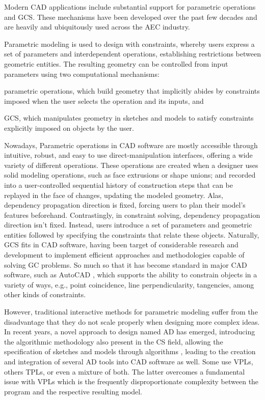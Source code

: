 \cleardoublepage
\label{chap:intro}

\noindent
Modern \ac{CAD} applications include substantial support for parametric
operations and \ac{GCS}.  These mechanisms have been developed over the past few
decades \cite{Bettig:2011:GCSPC:1.3593408} and are heavily and ubiquitously used
across the \ac{AEC} industry.

Parametric modeling is used to design with constraints, whereby users express a
set of parameters and interdependent operations, establishing restrictions
between geometric entities.  The resulting geometry can be controlled from input
parameters using two computational mechanisms:
\begin{enumerate*}[label=(\arabic*)]
  \item parametric operations, which build geometry that implicitly abides by
  constraints imposed when the user selects the operation and its inputs, and
  \item \ac{GCS}, which manipulates geometry in sketches and models to satisfy
  constraints explicitly imposed on objects by the user.
\end{enumerate*}

Nowadays, Parametric operations in \ac{CAD} software are mostly accessible
through intuitive, robust, and easy to use direct-manipulation interfaces,
offering a wide variety of different operations.  These operations are created
when a designer uses solid modeling operations, such as face extrusions or shape
unions; and recorded into a user-controlled sequential history of construction
steps that can be replayed in the face of changes, updating the modeled
geometry.  Alas, dependency propagation direction is fixed, forcing users to
plan their model's features beforehand.  Contrastingly, in constraint solving,
dependency propagation direction isn't fixed.  Instead, users introduce a set of
parameters and geometric entities followed by specifying the constraints that
relate these objects.  Naturally, \ac{GCS} fits in \ac{CAD} software, having
been target of considerable research and development to implement efficient
approaches and methodologies capable of solving \ac{GC} problems.  So much so
that it has become standard in major \ac{CAD} software, such as AutoCAD
\cite{Autodesk:1982:AutoCAD}, which supports the ability to constrain objects in
a variety of ways, e.g., point coincidence, line perpendicularity, tangencies,
among other kinds of constraints.

However, traditional interactive methods for parametric modeling suffer from the
disadvantage that they do not scale properly when designing more complex ideas.
In recent years, a novel approach to design named \ac{AD} has emerged,
introducing the algorithmic methodology also present in the \ac{CS} field,
allowing the specification of sketches and models through algorithms
\cite{McCormack:2004:GDPDR}, leading to the creation and integration of several
\ac{AD} tools into \ac{CAD} software as well.  Some use \acp{VPL}, others
\acp{TPL}, or even a mixture of both.  The latter overcomes a fundamental issue
with \acp{VPL} which is the frequently disproportionate complexity between the
program and the respective resulting model.


